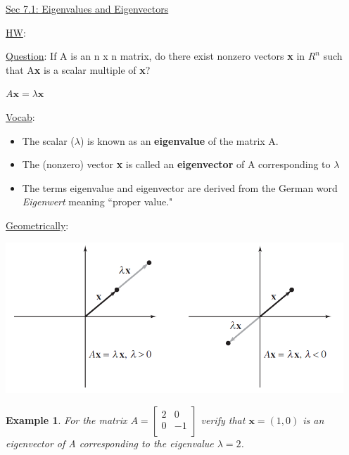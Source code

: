 \documentclass[12pt]{article}
\newtheorem{ex}{Example}
\newcommand{\tbf}{\textbf}
\begin{document}
\begin{center}
 \large{\underline{Sec 7.1: Eigenvalues and Eigenvectors}}
\end{center}

\underline{HW}:\\ 

\vspace{.1in}


\underline{Question}: If A is an n x n matrix, do there exist nonzero vectors \tbf{x} in $R^n$ such that A\tbf{x} is a scalar multiple of \tbf{x}?

\begin{center}
$A\tbf{x} = \lambda \tbf{x}$
\end{center}


\underline{Vocab}:
\begin{itemize}
\item
The scalar ($\lambda$) is known as an \tbf{eigenvalue} of the matrix A.

\item
The (nonzero) vector \tbf{x} is called an \tbf{eigenvector} of A corresponding to $\lambda$

\item
The terms eigenvalue and eigenvector are derived from the German word \textit{Eigenwert} meaning ``proper value."
\end{itemize}

\vspace{.1in}

\underline{Geometrically}:

\begin{center}
\includegraphics[width=5in]{ex1}
\end{center}

\begin{ex}

For the matrix $A = \begin{bmatrix}
2	&	0	\\
0	&	-1	\\
\end{bmatrix}$ verify that $\tbf{x} = (1,0)$ is an eigenvector of A corresponding to the eigenvalue $\lambda = 2$.
\end{ex}
\end{document}
